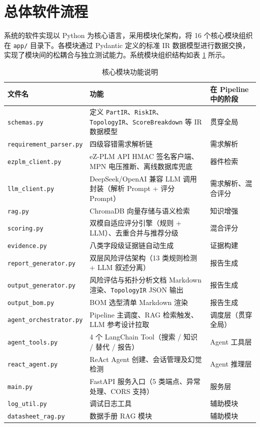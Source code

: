 
\section{总体软件流程}

系统的软件实现以 Python 为核心语言，采用模块化架构，将 16 个核心模块组织在 \texttt{app/} 目录下。各模块通过 Pydantic 定义的标准 IR 数据模型进行数据交换，实现了模块间的松耦合与独立测试能力。系统模块组织结构如表 \ref{tab:modules} 所示。

\begin{table}[htbp]
\centering
\caption{核心模块功能说明}
\label{tab:modules}
\footnotesize
\setlength{\tabcolsep}{6pt} %
\renewcommand{\arraystretch}{1.1} %
\begin{tabularx}{\textwidth}{p{4cm}Xp{3.5cm}}
\toprule
\textbf{文件名} & \textbf{功能} & \textbf{在 Pipeline 中的阶段} \\
\midrule
\texttt{schemas.py} & 定义 \texttt{PartIR}、\texttt{RiskIR}、\texttt{TopologyIR}、\texttt{ScoreBreakdown} 等 IR 数据模型 & 贯穿全局 \\
\texttt{requirement\_parser.py} & 四级容错需求解析链 & 需求解析 \\
\texttt{ezplm\_client.py} & eZ-PLM API HMAC 签名客户端、MPN 电压推断、离线数据库兜底 & 器件检索 \\
\texttt{llm\_client.py} & DeepSeek/OpenAI 兼容 LLM 调用封装（解析 Prompt + 评分 Prompt） & 需求解析、混合评分 \\
\texttt{rag.py} & ChromaDB 向量存储与语义检索 & 知识增强 \\
\texttt{scoring.py} & 双模自适应评分引擎（规则 + LLM）、去重合并与推荐分级 & 混合评分 \\
\texttt{evidence.py} & 八类字段级证据链自动生成 & 证据构建 \\
\texttt{report\_generator.py} & 双层风险评估架构（13 类规则检测 + LLM 叙述分离） & 报告生成 \\
\texttt{output\_generator.py} & 风险评估与拓扑分析文档 Markdown 渲染、\texttt{TopologyIR} JSON 输出 & 报告生成 \\
\texttt{output\_bom.py} & BOM 选型清单 Markdown 渲染 & 报告生成 \\
\texttt{agent\_orchestrator.py} & Pipeline 主调度、RAG 检索触发、LLM 参考设计拉取 & 调度层（贯穿全局） \\
\texttt{agent\_tools.py} & 4 个 LangChain Tool（搜索 / 知识 / 替代 / 报告） & Agent 工具层 \\
\texttt{react\_agent.py} & ReAct Agent 创建、会话管理及幻觉检测 & Agent 推理层 \\
\texttt{main.py} & FastAPI 服务入口（5 类端点、异常处理、CORS 支持） & 服务层 \\
\texttt{log\_util.py} & 调试日志工具 & 辅助模块 \\
\texttt{datasheet\_rag.py} & 数据手册 RAG 模块 & 辅助模块 \\
\bottomrule
\end{tabularx}
\end{table}


